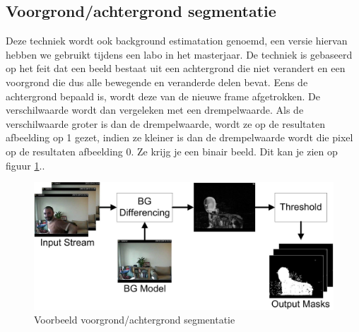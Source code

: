 \subsection{Voorgrond/achtergrond segmentatie}
\label{refBET}
Deze techniek wordt ook background estimatation genoemd, een versie hiervan hebben we gebruikt tijdens een labo in het masterjaar. De techniek is gebaseerd op het feit dat een beeld bestaat uit een achtergrond die niet verandert en een voorgrond die dus alle bewegende en veranderde delen bevat. Eens de achtergrond bepaald is, wordt deze van de nieuwe frame afgetrokken. De verschilwaarde wordt dan vergeleken met een drempelwaarde. Als de verschilwaarde groter is dan de drempelwaarde, wordt ze op de resultaten afbeelding op 1 gezet, indien ze kleiner is dan de  drempelwaarde wordt die pixel op de resultaten afbeelding 0. Ze krijg je een binair beeld. Dit kan je zien op figuur \ref{imgVAS}.\cite{bibVAS}.

\begin{figure}[hbp]
	\includegraphics[scale=0.65]{BackgroundSegmentation}
	\caption{Voorbeeld voorgrond/achtergrond segmentatie}
	\label{imgVAS}
\end{figure}

